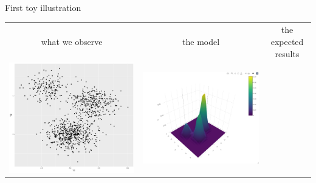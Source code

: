\documentclass[compress,10pt]{beamer}
\begin{document}
\begin{frame}{First  toy illustration}
\begin{tabular}{c|c|c}
   \tiny{what we observe} & \tiny{the model} &  \tiny{the expected results}  \\
   \includegraphics[scale=0.13]{bivariategaussianmixture}
  &\includegraphics[scale=0.13]{bivariategaussianmixtureDensity}

\end{tabular}
\end{frame}
\end{document}
